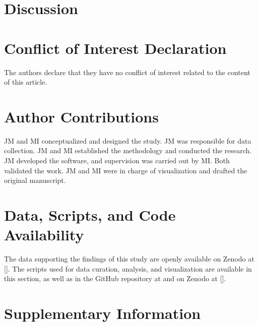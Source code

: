 \documentclass[spanish]{article}
\begin{document}
\hypertarget{discussion}{%
\section{Discussion}\label{discussion}}

\hypertarget{conflict-of-interest-declaration}{%
\section*{Conflict of Interest
Declaration}\label{conflict-of-interest-declaration}}

The authors declare that they have no conflict of interest related to
the content of this article.

\hypertarget{author-contributions}{%
\section{Author Contributions}\label{author-contributions}}

JM and MI conceptualized and designed the study. JM was responsible for
data collection. JM and MI established the methodology and conducted the
research. JM developed the software, and supervision was carried out by
MI. Both validated the work. JM and MI were in charge of visualization
and drafted the original manuscript.

\hypertarget{data-scripts-and-code-availability}{%
\section*{Data, Scripts, and Code
Availability}\label{data-scripts-and-code-availability}}

The data supporting the findings of this study are openly available on
Zenodo at \url{} {[}{]}. The scripts used for data curation, analysis,
and visualization are available in this section, as well as in the
GitHub repository at \url{} and on Zenodo at \url{} {[}{]}.

\newpage

\hypertarget{suppinfo}{%
\section*{Supplementary Information}\label{suppinfo}}

\beginsupplement
\end{document}
